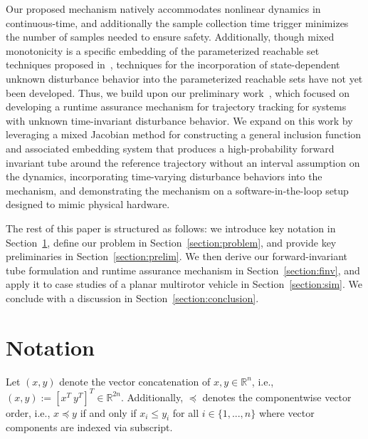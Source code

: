 \documentclass{IEEEojcsys}
\begin{document}
Our proposed mechanism natively accommodates nonlinear dynamics in continuous-time, and additionally the sample collection time trigger minimizes the number of samples needed to ensure safety. 
Additionally, though mixed monotonicity is a specific embedding of the parameterized reachable set techniques proposed in~\cite{harapanahalli2025parametric}, techniques for the incorporation of state-dependent unknown disturbance behavior into the parameterized reachable sets have not yet been developed. 
Thus, we build upon our preliminary work~\cite{caoICRARTA}, which focused on developing a runtime assurance mechanism for trajectory tracking for systems with unknown time-invariant disturbance behavior. We expand on this work by leveraging a mixed Jacobian method for constructing a general inclusion function and associated embedding system that produces a high-probability forward invariant tube around the reference trajectory without an interval assumption on the dynamics, incorporating time-varying disturbance behaviors into the mechanism, and demonstrating the mechanism on a software-in-the-loop setup designed to mimic physical hardware.

The rest of this paper is structured as follows: 
we introduce key notation in Section~\ref{section:notation}, define our problem in Section~\ref{section:problem}, and provide key preliminaries in Section~\ref{section:prelim}. We then derive our forward-invariant tube formulation and runtime assurance mechanism in Section~\ref{section:finv}, and apply it to case studies of a planar multirotor vehicle in Section~\ref{section:sim}. We conclude with a discussion in Section~\ref{section:conclusion}.

\section{Notation}
\label{section:notation}
Let $(x, y)$ denote the vector concatenation of $x, y \in \mathbb{R}^n$, i.e., $(x, y) := [x^T\ y^T]^T \in \mathbb{R}^{2n}$. Additionally, $\preceq$ denotes the componentwise vector order, i.e., $x\preceq y$ if and only if $x_i \leq y_i$ for all $i\in\{1, ..., n\}$ where vector components are indexed via subscript.
\end{document}
